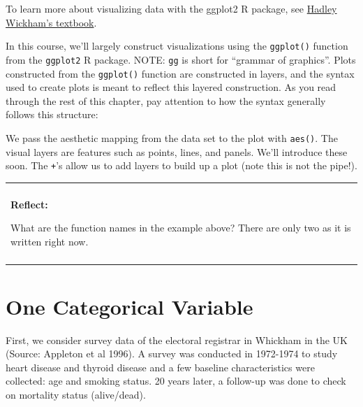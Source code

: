 \documentclass[
]{book}
\newenvironment{Shaded}{\begin{snugshade}}{\end{snugshade}}
\newcommand{\DataTypeTok}[1]{\textcolor[rgb]{0.13,0.29,0.53}{#1}}
\newcommand{\KeywordTok}[1]{\textcolor[rgb]{0.13,0.29,0.53}{\textbf{#1}}}
\newcommand{\NormalTok}[1]{#1}
\newcommand{\OperatorTok}[1]{\textcolor[rgb]{0.81,0.36,0.00}{\textbf{#1}}}
\newcommand{\StringTok}[1]{\textcolor[rgb]{0.31,0.60,0.02}{#1}}
\newenvironment{reflect}
{
    \begin{center}
    
    \begin{tabular}{|p{0.8\textwidth}|}
    \rowcolor{LightBlue}
    \hline\\
    \rowcolor{LightBlue}
    \textbf{Reflect:}
}
{
    \\\rowcolor{LightBlue}
    \\\hline
    \end{tabular} 
    \end{center}
}
\begin{document}
To learn more about visualizing data with the ggplot2 R package, see \href{https://r4ds.had.co.nz/data-visualisation.html}{Hadley Wickham's textbook}.

In this course, we'll largely construct visualizations using the \texttt{ggplot()} function from the \texttt{ggplot2} R package. NOTE: \texttt{gg} is short for ``grammar of graphics''. Plots constructed from the \texttt{ggplot()} function are constructed in layers, and the syntax used to create plots is meant to reflect this layered construction. As you read through the rest of this chapter, pay attention to how the syntax generally follows this structure:

\begin{Shaded}
\end{Shaded}

We pass the aesthetic mapping from the data set to the plot with \texttt{aes()}. The visual layers are features such as points, lines, and panels. We'll introduce these soon. The \texttt{+}'s allow us to add layers to build up a plot (note this is not the pipe!).

\begin{reflect}
What are the function names in the example above? There are only two as
it is written right now.
\end{reflect}

\hypertarget{one-categorical-variable}{%
\section{One Categorical Variable}\label{one-categorical-variable}}

First, we consider survey data of the electoral registrar in Whickham in the UK (Source: Appleton et al 1996). A survey was conducted in 1972-1974 to study heart disease and thyroid disease and a few baseline characteristics were collected: age and smoking status. 20 years later, a follow-up was done to check on mortality status (alive/dead).
\end{document}
